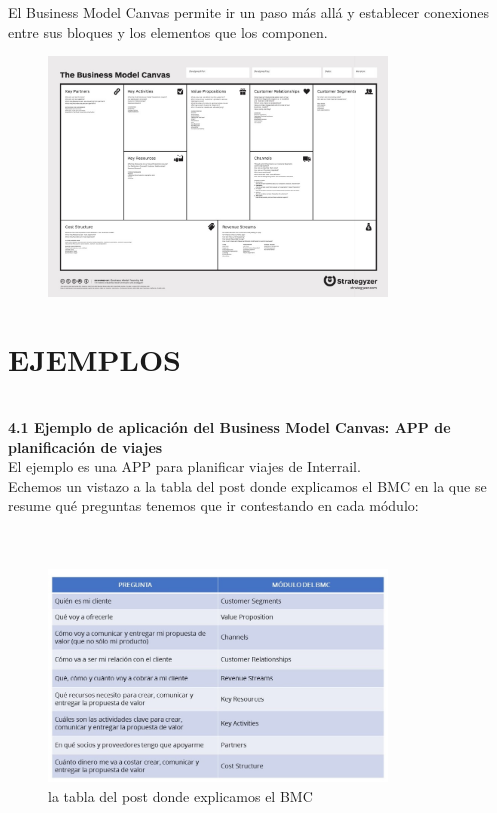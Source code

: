 \documentclass[a4paper,12pt,twocolumn]{article}
\begin{document}
\item {El Business Model Canvas permite ir un paso más allá y establecer conexiones entre sus bloques y los elementos que los componen.}

\begin{figure}[h!]
\centering
\includegraphics[width=9cm]{./Imagenes/img17}

\end{figure}




\section{EJEMPLOS}
\\
\textbf{4.1 Ejemplo de aplicación del Business Model Canvas: APP de planificación de viajes}
\\
El ejemplo es una APP para planificar viajes de Interrail.
\\
Echemos un vistazo a la tabla del post donde explicamos el BMC en la que se resume qué preguntas tenemos que ir contestando en cada módulo:
\\
\textbf{}
\\
\\
\begin{figure}[h!]
\centering
\includegraphics[width=9cm]{./Imagenes/img18}
\caption{\label{fig:01}la tabla del post donde explicamos el BMC}
\end{figure}
\end{document}
